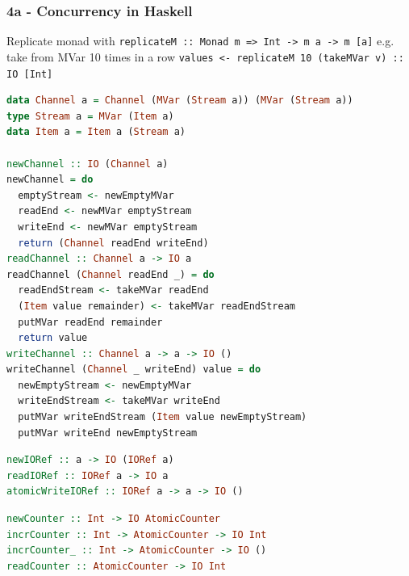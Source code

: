 \subsubsection*{4a - Concurrency in Haskell}



Replicate monad with \mbox{\texttt{replicateM :: Monad m => Int -> m a -> m [a]}}
e.g. take from MVar 10 times in a row \mbox{\texttt{values <- replicateM 10 (takeMVar v) :: IO [Int]}}

\hSep

\begin{lstlisting}[language=Haskell]
data Channel a = Channel (MVar (Stream a)) (MVar (Stream a))
type Stream a = MVar (Item a)
data Item a = Item a (Stream a)

newChannel :: IO (Channel a)
newChannel = do
  emptyStream <- newEmptyMVar
  readEnd <- newMVar emptyStream
  writeEnd <- newMVar emptyStream
  return (Channel readEnd writeEnd)
readChannel :: Channel a -> IO a
readChannel (Channel readEnd _) = do
  readEndStream <- takeMVar readEnd
  (Item value remainder) <- takeMVar readEndStream
  putMVar readEnd remainder
  return value
writeChannel :: Channel a -> a -> IO ()
writeChannel (Channel _ writeEnd) value = do
  newEmptyStream <- newEmptyMVar
  writeEndStream <- takeMVar writeEnd
  putMVar writeEndStream (Item value newEmptyStream)
  putMVar writeEnd newEmptyStream
\end{lstlisting}

\hSep

\begin{lstlisting}[language=Haskell]
newIORef :: a -> IO (IORef a)
readIORef :: IORef a -> IO a
atomicWriteIORef :: IORef a -> a -> IO ()
\end{lstlisting}

\hSep

\begin{lstlisting}[language=Haskell]
newCounter :: Int -> IO AtomicCounter
incrCounter :: Int -> AtomicCounter -> IO Int
incrCounter_ :: Int -> AtomicCounter -> IO ()
readCounter :: AtomicCounter -> IO Int
\end{lstlisting}

\hSep

